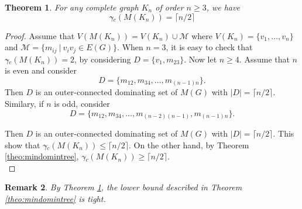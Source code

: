 \documentclass[a4paper,12pt, reqno]{amsart}
\newtheorem{Theorem}{Theorem}[section]
\newtheorem{Remark}[Theorem]{Remark}
\begin{document}
\begin{Theorem}\label{theo:outmindomincomplete}
For any complete graph $ K_{n}$ of order $n \geq 3$, we have
	  $$\gamma{\tilde{}} _{c}(M(K_{n}))=\lceil n/2\rceil$$
\end{Theorem}
\begin{proof}
Assume that $V(M(K_n))=V(K_n) \cup \mathcal{M}$ where $V(K_n)=\{v_1, \dots, v_n\}$ and $\mathcal{M}=\{m_{ij} ~|~v_i v_j \in E(G)\}$. %
When $n=3$, it is easy to check that $\gamma{\tilde{}} _{c}(M(K_{n}))=2$, by considering $D=\{v_1, m_{23}\}$. Now let $n \geq 4$. Assume that $n$ is even and consider \[
D=\{m_{12}, m_{34}, \dots, m_{(n-1)n}\}
.\] Then $D$ is an outer-connected dominating set of $M(G)$ with $|D|=\lceil n/2\rceil$. Similary, if $n$ is odd, consider 
\[D=\{m_{12}, m_{34}, \dots, m_{(n-2)(n-1)}, m_{(n-1)n}\}.\]

 Then $D$ is an outer-connected dominating set of $M(G)$ with $|D|=\lceil n/2\rceil$. This show that $\gamma{\tilde{}} _{c}(M(K_{n}))\leq \lceil n/2\rceil .$ On the other hand, by Theorem \ref{theo:mindomintree}, $\gamma{\tilde{}} _{c}(M(K_{n}))\geq \lceil n/2\rceil .$
 \\
\end{proof}
\begin{Remark}
By Theorem \ref{theo:outmindomincomplete}, the lower bound described in Theorem \ref{theo:mindomintree} is tight.
\end{Remark}
\end{document}
